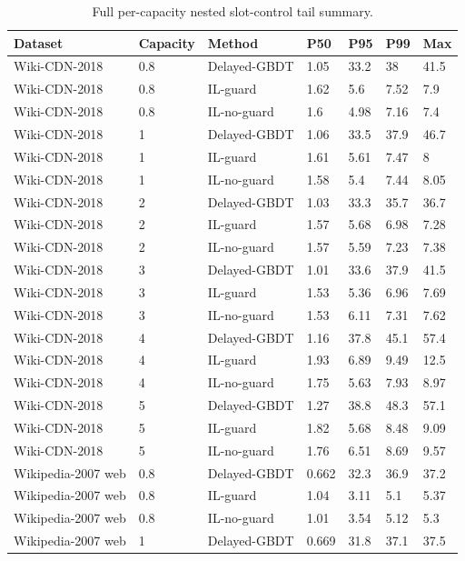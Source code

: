 \begin{table}[t]
\centering
\footnotesize
\caption{Full per-capacity nested slot-control tail summary.}
\label{tab:overhead_tail_full_appendix}
\begin{tabular}{lllllll}
\toprule
Dataset & Capacity & Method & P50 & P95 & P99 & Max \\
\midrule
Wiki-CDN-2018 & 0.8 & Delayed-GBDT & 1.05 & 33.2 & 38 & 41.5 \\
Wiki-CDN-2018 & 0.8 & IL-guard & 1.62 & 5.6 & 7.52 & 7.9 \\
Wiki-CDN-2018 & 0.8 & IL-no-guard & 1.6 & 4.98 & 7.16 & 7.4 \\
Wiki-CDN-2018 & 1 & Delayed-GBDT & 1.06 & 33.5 & 37.9 & 46.7 \\
Wiki-CDN-2018 & 1 & IL-guard & 1.61 & 5.61 & 7.47 & 8 \\
Wiki-CDN-2018 & 1 & IL-no-guard & 1.58 & 5.4 & 7.44 & 8.05 \\
Wiki-CDN-2018 & 2 & Delayed-GBDT & 1.03 & 33.3 & 35.7 & 36.7 \\
Wiki-CDN-2018 & 2 & IL-guard & 1.57 & 5.68 & 6.98 & 7.28 \\
Wiki-CDN-2018 & 2 & IL-no-guard & 1.57 & 5.59 & 7.23 & 7.38 \\
Wiki-CDN-2018 & 3 & Delayed-GBDT & 1.01 & 33.6 & 37.9 & 41.5 \\
Wiki-CDN-2018 & 3 & IL-guard & 1.53 & 5.36 & 6.96 & 7.69 \\
Wiki-CDN-2018 & 3 & IL-no-guard & 1.53 & 6.11 & 7.31 & 7.62 \\
Wiki-CDN-2018 & 4 & Delayed-GBDT & 1.16 & 37.8 & 45.1 & 57.4 \\
Wiki-CDN-2018 & 4 & IL-guard & 1.93 & 6.89 & 9.49 & 12.5 \\
Wiki-CDN-2018 & 4 & IL-no-guard & 1.75 & 5.63 & 7.93 & 8.97 \\
Wiki-CDN-2018 & 5 & Delayed-GBDT & 1.27 & 38.8 & 48.3 & 57.1 \\
Wiki-CDN-2018 & 5 & IL-guard & 1.82 & 5.68 & 8.48 & 9.09 \\
Wiki-CDN-2018 & 5 & IL-no-guard & 1.76 & 6.51 & 8.69 & 9.57 \\
Wikipedia-2007 web & 0.8 & Delayed-GBDT & 0.662 & 32.3 & 36.9 & 37.2 \\
Wikipedia-2007 web & 0.8 & IL-guard & 1.04 & 3.11 & 5.1 & 5.37 \\
Wikipedia-2007 web & 0.8 & IL-no-guard & 1.01 & 3.54 & 5.12 & 5.3 \\
Wikipedia-2007 web & 1 & Delayed-GBDT & 0.669 & 31.8 & 37.1 & 37.5 \\

\end{tabular}
\end{table}

